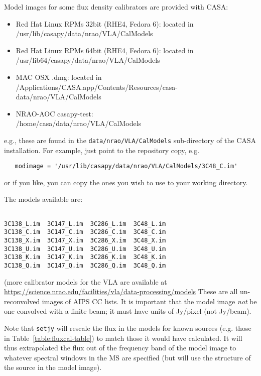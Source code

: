 Model images for some flux density calibrators are provided with CASA:
\begin{itemize}
   \item Red Hat Linux RPMs 32bit (RHE4, Fedora 6): 
         located in\\ /usr/lib/casapy/data/nrao/VLA/CalModels
   \item Red Hat Linux RPMs 64bit (RHE4, Fedora 6): 
         located in\\ /usr/lib64/casapy/data/nrao/VLA/CalModels
   \item MAC OSX .dmg: located in\\ /Applications/CASA.app/Contents/Resources/casa-data/nrao/VLA/CalModels
   \item NRAO-AOC casapy-test:\\ /home/casa/data/nrao/VLA/CalModels
\end{itemize}
e.g., these are found in the {\tt data/nrao/VLA/CalModels}
sub-directory of the CASA installation.  For example, just point to the
repository copy, e.g.
\small
\begin{verbatim}
   modimage = '/usr/lib/casapy/data/nrao/VLA/CalModels/3C48_C.im'
\end{verbatim}
\normalsize
or if you like, you can copy the ones you wish to use to your working
directory.

The models available are:
\small
\begin{verbatim}

3C138_L.im  3C147_L.im  3C286_L.im  3C48_L.im
3C138_C.im  3C147_C.im  3C286_C.im  3C48_C.im
3C138_X.im  3C147_X.im  3C286_X.im  3C48_X.im
3C138_U.im  3C147_U.im  3C286_U.im  3C48_U.im
3C138_K.im  3C147_K.im  3C286_K.im  3C48_K.im
3C138_Q.im  3C147_Q.im  3C286_Q.im  3C48_Q.im
\end{verbatim}

(more calibrator models for the VLA are available at\\
\url{https://science.nrao.edu/facilities/vla/data-processing/models}
\normalsize
These are all un-reconvolved images of AIPS CC lists.  
It is important that the model image {\em not} be one
convolved with a finite beam; it must have units of Jy/pixel (not
Jy/beam).  

Note that {\tt setjy} will rescale the flux in the models for known
sources (e.g. those in Table~\ref{table:fluxcal-table}) to match those
it would have calculated.  It will thus extrapolated the flux out of
the frequency band of the model image to whatever spectral windows
in the MS are specified (but will use the structure of the source
in the model image).

